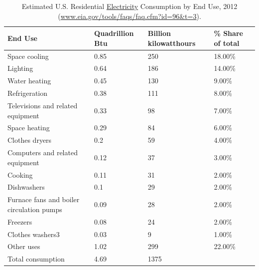 \documentclass[10pt, letterpaper]{article}
\begin{document}
\begin{spacing}{1.0}
\begin{table}[H]\centering\footnotesize
\caption{\label{eleEndUse}  Estimated U.S. Residential \underline{Electricity} Consumption by End
  Use, 2012 (\url{www.eia.gov/tools/faqs/faq.cfm?id=96&t=3}).}
\begin{tabular} {llll}   \hline 
End Use&Quadrillion Btu &Billion kilowatthours& \% Share of total\\\hline 
Space cooling&0.85&250&18.00\%\\
Lighting&0.64&186&14.00\%\\
Water heating&0.45&130&9.00\%\\
Refrigeration&0.38&111&8.00\%\\
Televisions and related equipment&0.33&98&7.00\%\\
Space heating&0.29&84&6.00\%\\
Clothes dryers&0.2&59&4.00\%\\
Computers and related equipment&0.12&37&3.00\%\\
Cooking&0.11&31&2.00\%\\
Dishwashers &0.1&29&2.00\%\\
Furnace fans and boiler circulation pumps&0.09&28&2.00\%\\
Freezers&0.08&24&2.00\%\\
Clothes washers3&0.03&9&1.00\%\\
Other uses&1.02&299&22.00\%\\\hline
Total consumption&4.69&1375&\\\hline
\end{tabular}\end{table}








\end{spacing}
\end{document}
